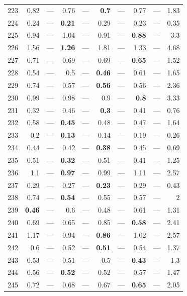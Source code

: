 \begin{longtable}{lr@{\hskip 4pt}l@{\hskip 12pt}r@{\hskip 4pt}l@{\hskip 12pt}r@{\hskip 4pt}l@{\hskip 12pt}r@{\hskip 4pt}l@{\hskip 12pt}r}
223 & 0.82 & --- & 0.76 & --- & \textbf{0.7} & --- & 0.77 & --- & 1.83 \\
224 & 0.24 & --- & \textbf{0.21} & --- & 0.29 & --- & 0.23 & --- & 0.35 \\
225 & 0.94 & --- & 1.04 & --- & 0.91 & --- & \textbf{0.88} & --- & 3.3 \\
226 & 1.56 & --- & \textbf{1.26} & --- & 1.81 & --- & 1.33 & --- & 4.68 \\
227 & 0.71 & --- & 0.69 & --- & 0.69 & --- & \textbf{0.65} & --- & 1.52 \\
228 & 0.54 & --- & 0.5 & --- & \textbf{0.46} & --- & 0.61 & --- & 1.65 \\
229 & 0.74 & --- & 0.57 & --- & \textbf{0.56} & --- & 0.56 & --- & 2.36 \\
230 & 0.99 & --- & 0.98 & --- & 0.9 & --- & \textbf{0.8} & --- & 3.33 \\
231 & 0.32 & --- & 0.46 & --- & \textbf{0.3} & --- & 0.41 & --- & 0.76 \\
232 & 0.58 & --- & \textbf{0.45} & --- & 0.48 & --- & 0.47 & --- & 1.64 \\
233 & 0.2 & --- & \textbf{0.13} & --- & 0.14 & --- & 0.19 & --- & 0.26 \\
234 & 0.44 & --- & 0.42 & --- & \textbf{0.38} & --- & 0.45 & --- & 0.69 \\
235 & 0.51 & --- & \textbf{0.32} & --- & 0.51 & --- & 0.41 & --- & 1.25 \\
236 & 1.1 & --- & \textbf{0.97} & --- & 0.99 & --- & 1.11 & --- & 2.57 \\
237 & 0.29 & --- & 0.27 & --- & \textbf{0.23} & --- & 0.29 & --- & 0.43 \\
238 & 0.74 & --- & \textbf{0.54} & --- & 0.55 & --- & 0.57 & --- & 2 \\
239 & \textbf{0.46} & --- & 0.6 & --- & 0.48 & --- & 0.61 & --- & 1.31 \\
240 & 0.69 & --- & 0.65 & --- & 0.85 & --- & \textbf{0.58} & --- & 2.41 \\
241 & 1.17 & --- & 0.94 & --- & \textbf{0.86} & --- & 1.02 & --- & 2.57 \\
242 & 0.6 & --- & 0.52 & --- & \textbf{0.51} & --- & 0.54 & --- & 1.37 \\
243 & 0.53 & --- & 0.51 & --- & 0.5 & --- & \textbf{0.43} & --- & 1.3 \\
244 & 0.56 & --- & \textbf{0.52} & --- & 0.52 & --- & 0.57 & --- & 1.47 \\
245 & 0.72 & --- & 0.68 & --- & 0.67 & --- & \textbf{0.65} & --- & 2.05 \\

\end{longtable}
